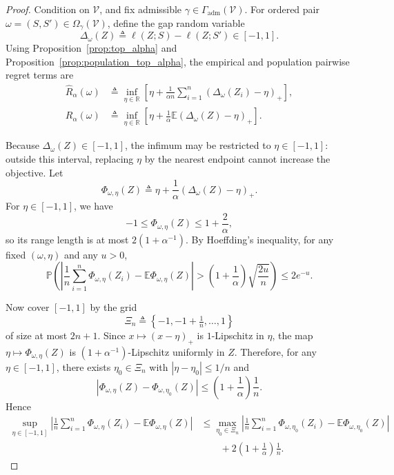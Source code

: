 \documentclass{article}
\newcommand{\RR}{\mathbb{R}}
\newcommand{\EE}{\mathbb{E}}
\newcommand{\PP}{\mathbb{P}}
\newcommand{\cV}{\mathcal{V}}
\newcommand{\braces}[1]{\left\{ #1 \right\}}
\newcommand{\loss}{\ell}
\newcommand{\1}{\mathbbm{1}}
\begin{document}
\begin{proof}
Condition on \(\cV\), and fix admissible \(\gamma\in\Gamma_{\mathrm{adm}}(\cV)\). For ordered pair \(\omega=(S,S')\in\Omega_\gamma(\cV)\), define the gap random variable
\[
    \Delta_\omega(Z)
    \triangleq
    \loss(Z;S)-\loss(Z;S') \in [-1,1].
\]
Using Proposition~\ref{prop:top_alpha} and Proposition~\ref{prop:population_top_alpha}, the empirical and population pairwise regret terms are
\begin{align}
    \widehat{R}_\alpha(\omega)
    &\triangleq
    \inf_{\eta\in\RR}
    \left[
        \eta + \frac{1}{\alpha n}\sum_{i=1}^{n}(\Delta_\omega(Z_i)-\eta)_+
    \right],
    \label{eq:emp_pair}
    \\
    R_\alpha(\omega)
    &\triangleq
    \inf_{\eta\in\RR}
    \left[
        \eta + \frac{1}{\alpha}\EE(\Delta_\omega(Z)-\eta)_+
    \right].
    \label{eq:pop_pair}
\end{align}

Because \(\Delta_\omega(Z)\in[-1,1]\), the infimum may be restricted to \(\eta\in[-1,1]\): outside this interval, replacing \(\eta\) by the nearest endpoint cannot increase the objective. Let
\[
    \Phi_{\omega,\eta}(Z)
    \triangleq
    \eta + \frac{1}{\alpha}(\Delta_\omega(Z)-\eta)_+.
\]
For \(\eta\in[-1,1]\), we have
\[
    -1 \le \Phi_{\omega,\eta}(Z) \le 1 + \frac{2}{\alpha},
\]
so its range length is at most \(2(1+\alpha^{-1})\). By Hoeffding's inequality, for any fixed \((\omega,\eta)\) and any \(u>0\),
\[
    \PP\!\left(
        \left|
            \frac{1}{n}\sum_{i=1}^{n}\Phi_{\omega,\eta}(Z_i)
            -
            \EE\Phi_{\omega,\eta}(Z)
        \right|
        >
        \left(1+\frac{1}{\alpha}\right)\sqrt{\frac{2u}{n}}
    \right)
    \le
    2e^{-u}.
\]

Now cover \([-1,1]\) by the grid
\[
    \Xi_n \triangleq \braces{-1,-1+\tfrac1n,\ldots,1}
\]
of size at most \(2n+1\). Since \(x\mapsto (x-\eta)_+\) is \(1\)-Lipschitz in \(\eta\), the map \(\eta\mapsto \Phi_{\omega,\eta}(Z)\) is \((1+\alpha^{-1})\)-Lipschitz uniformly in \(Z\). Therefore, for any \(\eta\in[-1,1]\), there exists \(\eta_0\in\Xi_n\) with \(|\eta-\eta_0|\le 1/n\) and
\[
    \left|
        \Phi_{\omega,\eta}(Z)-\Phi_{\omega,\eta_0}(Z)
    \right|
    \le
    \left(1+\frac{1}{\alpha}\right)\frac{1}{n}.
\]
Hence
\begin{align}
    \sup_{\eta\in[-1,1]}
    \left|
        \frac{1}{n}\sum_{i=1}^{n}\Phi_{\omega,\eta}(Z_i)
        -
        \EE\Phi_{\omega,\eta}(Z)
    \right|
    &\le
    \max_{\eta_0\in\Xi_n}
    \left|
        \frac{1}{n}\sum_{i=1}^{n}\Phi_{\omega,\eta_0}(Z_i)
        -
        \EE\Phi_{\omega,\eta_0}(Z)
    \right|
    \nonumber\\
    &\qquad +
    2\left(1+\frac{1}{\alpha}\right)\frac{1}{n}.
    \label{eq:net_bound}
\end{align}


\end{proof}
\end{document}
